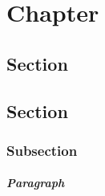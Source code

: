 \chapter{Chapter}
\blindtext
\section{Section}
\blindtext
\section{Section}
\blindtext
\subsection{Subsection}
\blindtext
\paragraph{Paragraph}